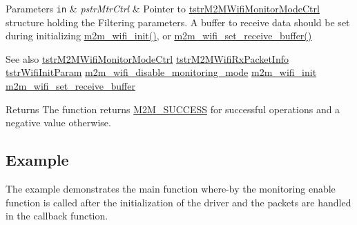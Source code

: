 \begin{DoxyParams}[1]{Parameters}
\mbox{\tt in}  & {\em pstr\+Mtr\+Ctrl} & Pointer to \hyperlink{structtstrM2MWifiMonitorModeCtrl}{tstr\+M2\+M\+Wifi\+Monitor\+Mode\+Ctrl} structure holding the Filtering parameters. A buffer to receive data should be set during initializing \hyperlink{group__WifiInitFn_ga73c734812e844d96d860c4e93e9daf35}{m2m\+\_\+wifi\+\_\+init()}, or \hyperlink{m2m__wifi_8c_a50cd420caaafca3ff68ec77d26ceba54}{m2m\+\_\+wifi\+\_\+set\+\_\+receive\+\_\+buffer()} \\
\hline
\end{DoxyParams}
\begin{DoxySeeAlso}{See also}
\hyperlink{structtstrM2MWifiMonitorModeCtrl}{tstr\+M2\+M\+Wifi\+Monitor\+Mode\+Ctrl} \hyperlink{structtstrM2MWifiRxPacketInfo}{tstr\+M2\+M\+Wifi\+Rx\+Packet\+Info} \hyperlink{structtstrWifiInitParam}{tstr\+Wifi\+Init\+Param} \hyperlink{group__WifiDisableMonitorModeFn_ga22d6c3d2f63fceac652835994cb15594}{m2m\+\_\+wifi\+\_\+disable\+\_\+monitoring\+\_\+mode} \hyperlink{group__WifiInitFn_ga73c734812e844d96d860c4e93e9daf35}{m2m\+\_\+wifi\+\_\+init} \hyperlink{m2m__wifi_8c_a50cd420caaafca3ff68ec77d26ceba54}{m2m\+\_\+wifi\+\_\+set\+\_\+receive\+\_\+buffer} 
\end{DoxySeeAlso}
\begin{DoxyReturn}{Returns}
The function returns \hyperlink{nm__common_8h_a9ef27ba27aafdd1aa3a79d3ba2c36b8f}{M2\+M\+\_\+\+S\+U\+C\+C\+E\+SS} for successful operations and a negative value otherwise.
\end{DoxyReturn}
\hypertarget{group__WifiEnableMonitorModeFn_Example}{}\subsection{Example}\label{group__WifiEnableMonitorModeFn_Example}
The example demonstrates the main function where-\/by the monitoring enable function is called after the initialization of the driver and the packets are handled in the callback function. 

